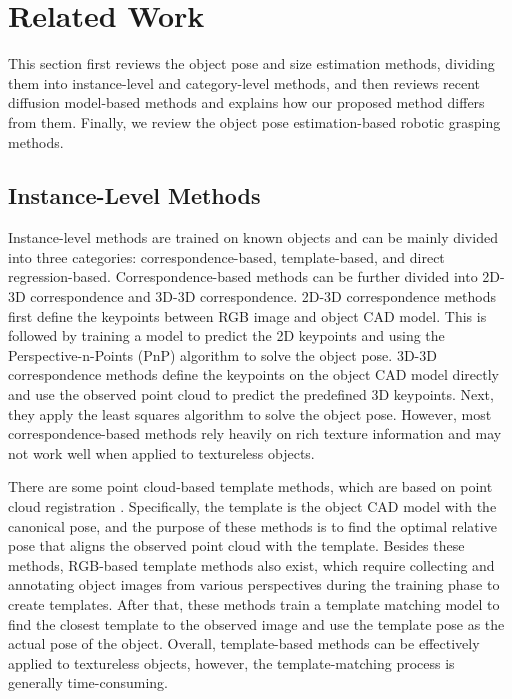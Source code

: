 \section{Related Work}
\label{Related Work}
This section first reviews the object pose and size estimation methods, dividing them into instance-level and category-level methods, and then reviews recent diffusion model-based methods and explains how our proposed method differs from them. Finally, we review the object pose estimation-based robotic grasping methods.

\vspace{-1.25em}
\subsection{Instance-Level Methods}
Instance-level methods are trained on known objects \cite{SSD-6D} and can be mainly divided into three categories: correspondence-based, template-based, and direct regression-based. Correspondence-based methods can be further divided into 2D-3D correspondence and 3D-3D correspondence. 2D-3D correspondence methods\cite{5,6} first define the keypoints between RGB image and object CAD model. This is followed by training a model to predict the 2D keypoints and using the Perspective-n-Points (PnP) algorithm to solve the object pose. 3D-3D correspondence methods\cite{7,8} define the keypoints on the object CAD model directly and use the observed point cloud to predict the predefined 3D keypoints. Next, they apply the least squares algorithm to solve the object pose. However, most correspondence-based methods rely heavily on rich texture information and may not work well when applied to textureless objects.

\par There are some point cloud-based template methods, which are based on point cloud registration \cite{9,10}. Specifically, the template is the object CAD model with the canonical pose, and the purpose of these methods is to find the optimal relative pose that aligns the observed point cloud with the template. Besides these methods, RGB-based template methods\cite{11,12} also exist, which require collecting and annotating object images from various perspectives during the training phase to create templates. After that, these methods train a template matching model to find the closest template to the observed image and use the template pose as the actual pose of the object. Overall, template-based methods can be effectively applied to textureless objects, however, the template-matching process is generally time-consuming.

